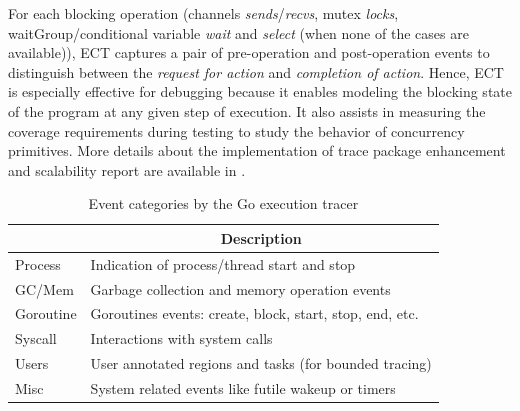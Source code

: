 

%
For each blocking operation (channels \textit{sends}/\textit{recvs}, mutex \textit{locks}, waitGroup/conditional variable \textit{wait} and \textit{select} (when none of the cases are available)), ECT captures a pair of pre-operation and post-operation events to distinguish between the \textit{request for action} and \textit{completion of action}.
%
Hence, ECT is especially effective for debugging because it enables modeling the blocking state of the program at any given step of execution.
%
It also assists in measuring the coverage requirements during testing to study the behavior of concurrency primitives.
%
More details about the implementation of trace package enhancement and scalability report are available in \cite{ect-arxiv}.

\begin{table}[]
    \centering
        \caption{Event categories by the Go execution tracer}
        \begin{tabular}{|l|l|}
        \hline
        \rowcolor[HTML]{C0C0C0}
        \multicolumn{1}{|c|}{\cellcolor[HTML]{C0C0C0}\textbf{Category}} & \multicolumn{1}{c|}{\cellcolor[HTML]{C0C0C0}\textbf{Description}} \\ \hline
        Process & Indication of process/thread start and stop \\ \hline
        GC/Mem & Garbage collection and memory operation events\\ \hline
        Goroutine & Goroutines events: create, block, start, stop, end, etc. \\ \hline
        Syscall & Interactions with system calls \\ \hline
        Users & User annotated regions and tasks (for bounded tracing) \\ \hline
        Misc & System related events like futile wakeup or timers \\ \hline
        \end{tabular}
    \label{tab:events}
\end{table}

